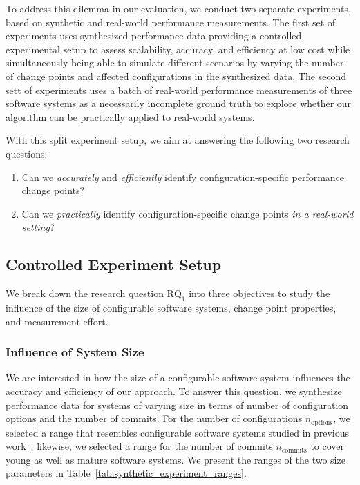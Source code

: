 \documentclass[sigconf]{acmart}
\begin{document}
	To address this dilemma in our evaluation, we conduct two separate experiments, based on synthetic and real-world performance measurements. The first set of experiments uses synthesized performance data providing a controlled experimental setup to assess scalability, accuracy, and efficiency at low cost while simultaneously being able to simulate different scenarios by varying the number of change points and affected configurations in the synthesized data.
	The second sett of experiments uses a batch of real-world performance measurements of three software systems as a necessarily incomplete ground truth to explore whether our algorithm can be practically applied to real-world systems.
	
	With this split experiment setup, we aim at answering the following two research questions:
	\begin{enumerate}
		\item Can we \emph{accurately} and \emph{efficiently} identify configuration-specific performance change points? 
		\item Can we \emph{practically} identify configuration-specific change points \emph{in a real-world setting}? 
	\end{enumerate}
	
	\subsection{Controlled Experiment Setup}
	We break down the research question $\text{RQ}_1$ into three objectives  to study the influence of the size of configurable software systems, change point properties, and measurement effort.
	
	\subsubsection{Influence of System Size}
	We are interested in how the size of a configurable software system influences the accuracy and efficiency of our approach. 
	To answer this question, we synthesize performance data for systems of varying size in terms of number of configuration options and the number of commits. For the number of configurations $n_\text{options}$, we selected a range that resembles configurable software systems studied in previous work~\cite{muhlbauer_accurate_2019}; likewise, we selected a range for the number of commits $n_\text{commits}$ to cover young as well as mature software systems. We present the ranges of the two size parameters in Table~\ref{tab:synthetic_experiment_ranges}.
	
\end{document}
